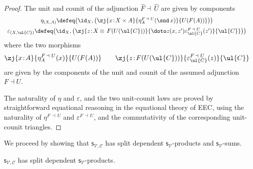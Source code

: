 \begin{proof}
The unit and counit of the adjunction $\widehat{F} \dashv\, \widehat{U}$ are given by components
\[
\begin{array}{c}
\eta_{(X,A)} \defeq \big(\id_X, \big(\zj {x \!:\! X \times A} {\eta^{F \,\dashv\,\, U}_A(\snd\, x)} {U(F(A))}\big)\big) 
\\[2mm]
\varepsilon_{(X,\ul{C})} \defeq \big(\id_X, \big(\zj {z \!:\! X \otimes\, F(U(\ul{C}))} {\doto z {(x,z')} {} {\varepsilon_{\ul{C}}^{F \,\dashv\,\, U}(z')}} {\ul{C}}\big)\big) 
\end{array}
\]
where the two morphisms
\[
\zj {x \!:\! A} {\eta^{F \,\dashv\,\, U}_A(x)} {U(F(A))}
\qquad
\zj {z \!:\! F(U(\ul{C}))} {\varepsilon_{\ul{C}}^{F \,\dashv\,\, U}(z)} {\ul{C}}
\]
are given by the components of the unit and counit of the assumed adjunction $F \dashv U$.

The naturality of $\eta$ and $\varepsilon$, and the two unit-counit laws are proved by straightforward equational reasoning in the equational theory of EEC\raisebox{0.75pt}{+}, using the naturality of $\eta^{F \,\dashv\, U}$ and $\varepsilon^{F \,\dashv\, U}$, and the commutativity of the corresponding unit-counit triangles.
\end{proof}


We proceed by showing that $\mathsf{s}_{\mathcal{V},\mathcal{C}}$ has split dependent $\mathsf{s}_{\mathcal{V}}$-products and $\mathsf{s}_{\mathcal{V}}$-sums. 


\begin{proposition}
\label{prop:eecsplitdependentproducts}
$\mathsf{s}_{\mathcal{V},\mathcal{C}}$ has split dependent $\mathsf{s}_{\mathcal{V}}$-products.
\end{proposition}

